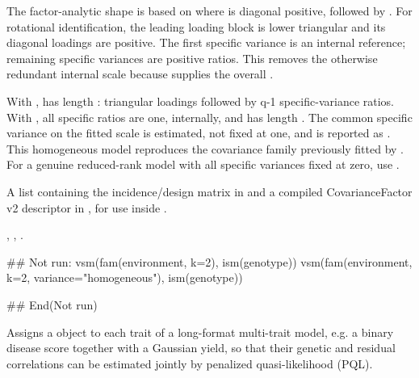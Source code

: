 \documentclass[a4paper]{book}
\begin{document}
\begin{Details}\relax
The factor-analytic shape is based on  where \eqn{\Psi}{} is diagonal positive, followed by .  For rotational identification, the leading  loading block is lower triangular and its diagonal loadings are positive.  The first specific variance is an internal reference; remaining specific variances are positive ratios.  This removes the otherwise redundant internal scale because  supplies the overall .

With ,  has length
: triangular loadings followed by q-1 specific-variance
ratios. With , all specific ratios are one,
 internally, and  has length .
The common specific variance on the fitted scale is estimated, not fixed
at one, and is reported as . This homogeneous
model reproduces the covariance family previously fitted by .
For a genuine reduced-rank model with all specific variances fixed at zero,
use .
\end{Details}
%
\begin{Value}
A list containing the incidence/design matrix in  and a compiled CovarianceFactor v2 descriptor in , for use inside .
\end{Value}
%
\begin{SeeAlso}\relax
{}, , .
\end{SeeAlso}
%
\begin{Examples}
\begin{ExampleCode}
## Not run: 
vsm(fam(environment, k=2), ism(genotype))
vsm(fam(environment, k=2, variance="homogeneous"), ism(genotype))

## End(Not run)
\end{ExampleCode}
\end{Examples}
%
\begin{Description}\relax
Assigns a  object to each trait of a long-format
multi-trait  model, e.g. a binary disease score together
with a Gaussian yield, so that their genetic and residual correlations can be
estimated jointly by penalized quasi-likelihood (PQL).
\end{Description}
\end{document}
